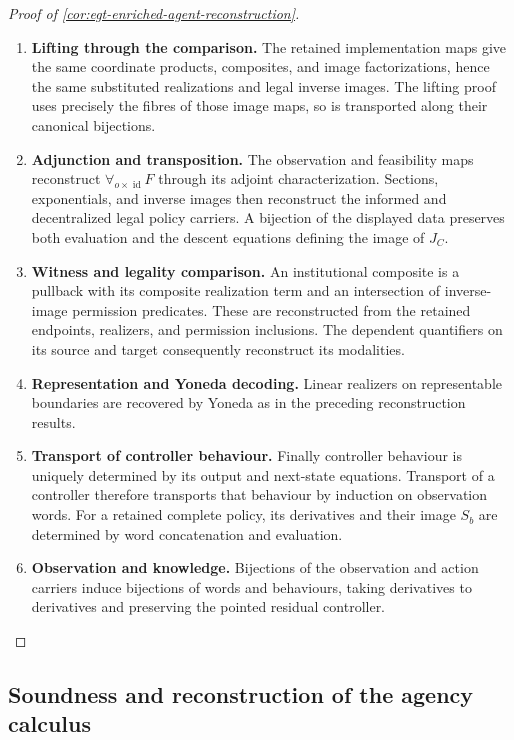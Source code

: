 \documentclass[11pt,a4paper]{article}
\numberwithin{equation}{section}
\theoremstyle{definition}
\theoremstyle{remark}
\theoremstyle{plain}
\begin{document}
\begin{proof}[Proof of \cref{cor:egt-enriched-agent-reconstruction}]
\leavevmode
\begin{enumerate}[label=\textup{(\arabic*)},leftmargin=*,itemsep=4pt,topsep=3pt]
  \item \textbf{Lifting through the comparison.} The retained implementation maps give the same coordinate products,
composites, and image factorizations, hence the same substituted
realizations and legal inverse images. The lifting proof uses
precisely the fibres of those image maps, so is transported along
their canonical bijections.
  \item \textbf{Adjunction and transposition.} The observation and feasibility maps reconstruct
$\forall_{o\times\operatorname{id}}F$ through its adjoint
characterization. Sections, exponentials, and inverse images
then reconstruct the informed and decentralized legal policy
carriers. A bijection of the displayed data preserves both
evaluation and the descent equations defining the image of $J_C$.
  \item \textbf{Witness and legality comparison.} An institutional composite is a pullback with its composite
realization term and an intersection of inverse-image permission
predicates. These are reconstructed from the retained endpoints,
realizers, and permission inclusions. The dependent quantifiers
on its source and target consequently reconstruct its modalities.
  \item \textbf{Representation and Yoneda decoding.} Linear realizers on representable boundaries are recovered by
Yoneda as in the preceding reconstruction results.
  \item \textbf{Transport of controller behaviour.} Finally controller behaviour is uniquely determined by its
output and next-state equations. Transport of a controller
therefore transports that behaviour by induction on observation
words. For a retained complete policy, its derivatives and their
image $S_b$ are determined by word concatenation and evaluation.
  \item \textbf{Observation and knowledge.} Bijections of the observation and action carriers induce
bijections of words and behaviours, taking derivatives to
derivatives and preserving the pointed residual controller.
\end{enumerate}
\end{proof}


\subsection{Soundness and reconstruction of the agency calculus}
\end{document}
